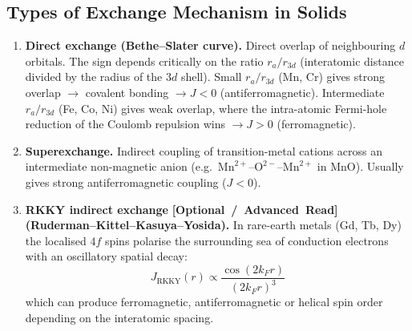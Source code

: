 \documentclass[11pt,a4paper]{article}
\newcommand{\extratag}{\hfill\mbox{\normalfont\footnotesize\sffamily\color{secondary}\textbf{[Optional / Advanced Read]}}}
\begin{document}
\subsection{Types of Exchange Mechanism in Solids}

\begin{enumerate}[leftmargin=1.6cm]
    \item \textbf{Direct exchange (Bethe--Slater curve).} Direct overlap of neighbouring $d$ orbitals. The sign depends critically on the ratio $r_a/r_{3d}$ (interatomic distance divided by the radius of the $3d$ shell). Small $r_a/r_{3d}$ (Mn, Cr) gives strong overlap $\to$ covalent bonding $\to J<0$ (antiferromagnetic). Intermediate $r_a/r_{3d}$ (Fe, Co, Ni) gives weak overlap, where the intra-atomic Fermi-hole reduction of the Coulomb repulsion wins $\to J>0$ (ferromagnetic).
    \item \textbf{Superexchange.} Indirect coupling of transition-metal cations across an intermediate non-magnetic anion (e.g.\ $\text{Mn}^{2+}$--$\text{O}^{2-}$--$\text{Mn}^{2+}$ in $\text{MnO}$). Usually gives strong antiferromagnetic coupling ($J<0$).
    \item \textbf{RKKY indirect exchange} \extratag\\
    \textbf{(Ruderman--Kittel--Kasuya--Yosida).} In rare-earth metals (Gd, Tb, Dy) the localised $4f$ spins polarise the surrounding sea of conduction electrons with an oscillatory spatial decay:
    \begin{equation}
        J_{\mathrm{RKKY}}(r) \propto \frac{\cos(2k_Fr)}{(2k_Fr)^3}
        \label{eq:rkky}
    \end{equation}
    which can produce ferromagnetic, antiferromagnetic or helical spin order depending on the interatomic spacing.
\end{enumerate}
\end{document}
